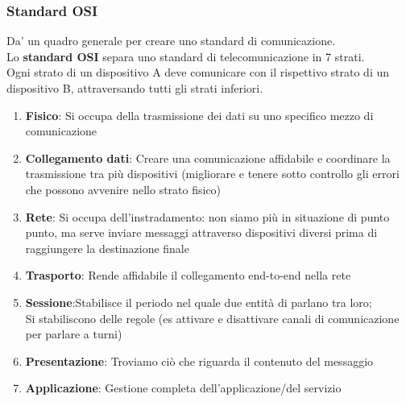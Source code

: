 \documentclass{article}
\begin{document}
\subsubsection{Standard OSI}
Da' un quadro generale per creare uno standard di comunicazione.\\
Lo \textbf{standard OSI} separa uno standard di telecomunicazione in 7 strati.\\
Ogni strato di un dispositivo A deve comunicare con il rispettivo strato di un dispositivo B, attraversando tutti gli strati inferiori.
\begin{enumerate}
	\item \textbf{Fisico}: Si occupa della trasmissione dei dati su uno specifico mezzo di comunicazione
	\item \textbf{Collegamento dati}: Creare una comunicazione affidabile e coordinare la trasmissione tra più dispositivi (migliorare e tenere sotto controllo gli errori che possono avvenire nello strato fisico)
	\item \textbf{Rete}: Si occupa dell'instradamento: non siamo più in situazione di punto punto, ma serve inviare messaggi attraverso dispositivi diversi prima di raggiungere la destinazione finale
	\item \textbf{Trasporto}: Rende affidabile il collegamento end-to-end nella rete
	\item \textbf{Sessione}:Stabilisce il periodo nel quale due entità di parlano tra loro;\\
	Si stabiliscono delle regole (es attivare e disattivare canali di comunicazione per parlare a turni)
	\item \textbf{Presentazione}: Troviamo ciò che riguarda il contenuto del messaggio
	\item \textbf{Applicazione}: Gestione completa dell'applicazione/del servizio
\end{enumerate}
\end{document}
